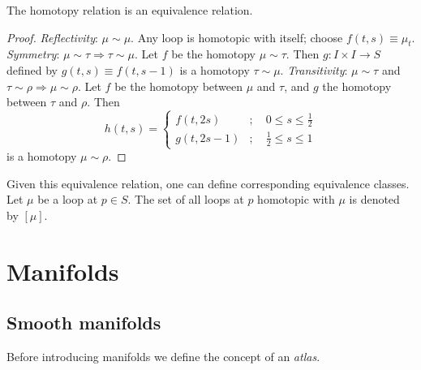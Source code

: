 \documentclass[10pt,reqno]{amsart}
\numberwithin{equation}{section}
\begin{document}
\begin{proposition}
	The homotopy relation is an equivalence relation.
\end{proposition}
\begin{proof}
	\emph{Reflectivity}: $\mu \sim \mu$. Any loop is homotopic 
	with itself; choose $f(t,s) \equiv \mu_t$.
	\emph{Symmetry}: $\mu \sim \tau \Rightarrow \tau \sim \mu$.  
	Let $f$ be the homotopy $\mu \sim \tau$. Then $g : I \times I 
	\to S$ defined by $g(t,s) \equiv f(t,s-1)$ is a homotopy $\tau 
	\sim \mu$.
	\emph{Transitivity}: $\mu \sim \tau$ and $\tau \sim \rho
	\Rightarrow \mu \sim \rho$. Let $f$ be the homotopy between 
	$\mu$ and $\tau$, and $g$ the homotopy between $\tau$ and 
	$\rho$. Then
	\begin{displaymath}
		h(t,s) =
		\begin{cases}
			f(t,2s) &;\quad 0 \leq s \leq \tfrac{1}{2} \\
			g(t,2s-1) &;\quad \tfrac{1}{2} \leq s \leq 1
		\end{cases}
	\end{displaymath}
	is a homotopy $\mu \sim \rho$.
\end{proof}

Given this equivalence relation, one can define corresponding 
equivalence classes. Let $\mu$ be a loop at $p \in S$. The set of 
all loops at $p$ homotopic with $\mu$ is denoted by $[\mu]$.

\section{Manifolds}

\subsection{Smooth manifolds}

Before introducing manifolds we define the concept of an 
\emph{atlas}.
\end{document}

